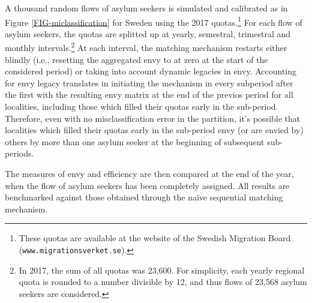 \documentclass[12pt,fleqn]{article}
\begin{document}
A thousand random flows of asylum seekers is simulated and calibrated as in Figure \ref{FIG-miclassification} for Sweden using the 2017 quotas.\footnote{These quotas are available at the website of the Swedish Migration Board (\texttt{www.migrationsverket.se}).} For each flow of asylum seekers, the quotas are splitted up at yearly, semestral, trimestral and monthly intervals.\footnote{In 2017, the sum of all quotas was 23,600. For simplicity, each yearly regional quota is rounded to a number divisible by 12, and thus flows of 23,568 asylum seekers are considered.} At each interval, the matching mechanism restarts either blindly (i.e., resetting the aggregated envy to at zero at the start of the considered period) or taking into account dynamic legacies in envy. Accounting for envy legacy translates in initiating the mechanism in every subperiod after the first with the resulting envy matrix at the end of the previos period for all localities, including those which filled their quotas early in the sub-period. Therefore, even with no misclassification error in the partition, it's possible that localities which filled their quotas early in the sub-period envy (or are envied by) others by more than one asylum seeker at the beginning of subsequent sub-periods. 

The measures of envy and efficiency are then compared at the end of the year, when the flow of asylum seekers has been completely assigned. All results are benchmarked against those obtained through the na\"{i}ve sequential matching mechanism.
\end{document}
